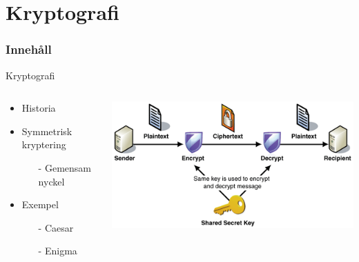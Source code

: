 \section{Kryptografi}
\begin{frame}
\frametitle{Innehåll}
\tableofcontents[currentsection]
\end{frame}

\begin{frame}{Kryptografi}


\begin{columns}
    \begin{column}{0.45\textwidth}
        \begin{itemize}
			\item Historia
			\item Symmetrisk kryptering
			\begin{itemize}
				\item[-] Gemensam nyckel
			\end{itemize}
			\item Exempel
			\begin{itemize}
				\item[-] Caesar
				\item[-] Enigma
			\end{itemize}
		\end{itemize}
    \end{column}
	\begin{column}{0.55\textwidth}
    	\includegraphics[width=\textwidth]{images/symmetric.png}
	\end{column}
\end{columns}

\end{frame}

